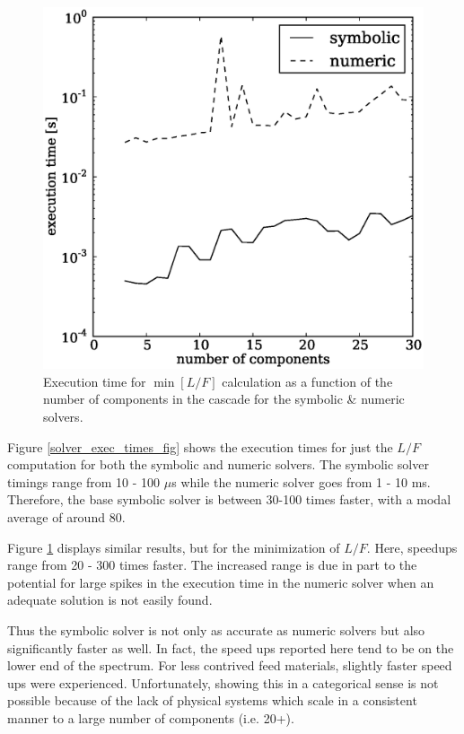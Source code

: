 \documentclass[preprint,12pt]{elsarticle}
\newcommand{\us}[0]{$\mu$s }
\begin{document}
\begin{figure}[htpb]
\begin{center}
\includegraphics[scale=0.5]{min_exec_times.eps}
\caption{Execution time for $\min\left[L/F\right]$ calculation as a function 
    of the number of 
    components in the cascade for the symbolic \& numeric solvers.}
\label{min_exec_times_fig}
\end{center}
\end{figure}

Figure \ref{solver_exec_times_fig} shows the execution times for just the $L/F$ 
computation for both the symbolic and numeric solvers.  The symbolic solver timings 
range
from 10 - 100 \us while the numeric solver goes from 1 - 10 ms.  Therefore,
the base symbolic solver is between 30-100 times faster, with a modal average of
around 80.

Figure \ref{min_exec_times_fig} displays similar results, but for the minimization
of $L/F$.  Here, speedups range from 20 - 300 times faster.  The increased range is 
due in part to the potential for large spikes in the execution time in the numeric 
solver when an adequate solution is not easily found.  

Thus the symbolic solver is not only as accurate as numeric solvers
but also significantly faster as well.  In fact, the speed ups reported here tend
to be on the lower end of the spectrum.  For less contrived feed materials, 
slightly faster speed ups were experienced.  Unfortunately, showing this in a 
categorical sense is not possible because of the lack of physical systems which 
scale in a consistent manner to a large number of components (i.e. 20+).
\end{document}

